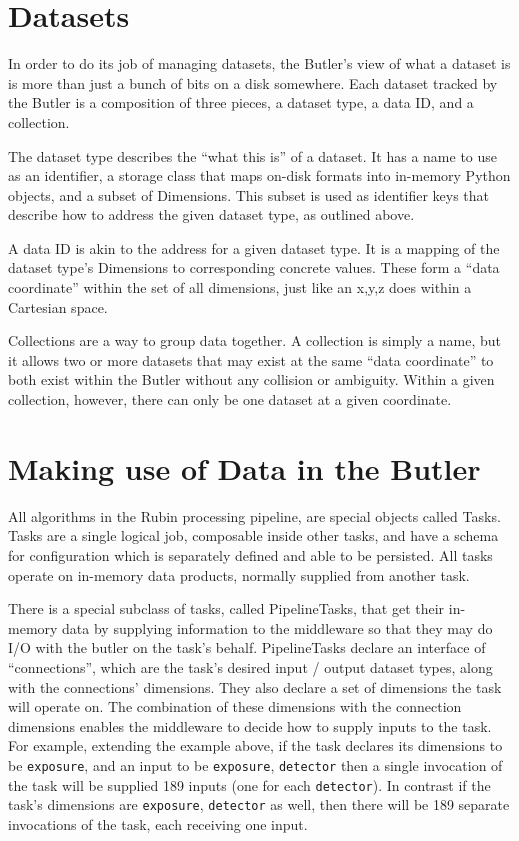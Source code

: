 \documentclass[11pt,twoside]{article}
\begin{document}
\section{Datasets}
In order to do its job of managing datasets, the Butler's view of what a dataset is is more than just a bunch of bits on a disk somewhere. Each dataset tracked by the Butler is a composition of three pieces, a dataset type, a data ID, and a collection.

The dataset type describes the ``what this is'' of a dataset. It has a name to use as an identifier, a storage class that maps on-disk formats into in-memory Python objects, and a subset of Dimensions. This subset is used as identifier keys that describe how to address the given dataset type, as outlined above.

A data ID is akin to the address for a given dataset type. It is a mapping of the dataset type's Dimensions to corresponding concrete values. These form a ``data coordinate'' within the set of all dimensions, just like an x,y,z does within a Cartesian space.

Collections are a way to group data together. A collection is simply a name, but it allows two or more datasets that may exist at the same ``data coordinate'' to both exist within the Butler without any collision or ambiguity. Within a given collection, however, there can only be one dataset at a given coordinate.

\section{Making use of Data in the Butler}
All algorithms in the Rubin processing pipeline, are special objects called Tasks. Tasks are a single logical job, composable inside other tasks, and have a schema for configuration which is separately defined and able to be persisted. All tasks operate on in-memory data products, normally supplied from another task.

There is a special subclass of tasks, called PipelineTasks, that get their in-memory data by supplying information to the middleware so that they may do I/O with the butler on the task's behalf. PipelineTasks declare an interface of ``connections'', which are the task's desired input / output dataset types, along with the connections' dimensions. They also declare a set of dimensions the task will operate on. The combination of these dimensions with the connection dimensions enables the middleware to decide how to supply inputs to the task. For example, extending the example above, if the task declares its dimensions to be \texttt{exposure}, and an input to be \texttt{exposure}, \texttt{detector} then a single invocation of the task will be supplied 189 inputs (one for each \texttt{detector}). In contrast if the task's dimensions are \texttt{exposure}, \texttt{detector} as well, then there will be 189 separate invocations of the task, each receiving one input.
\end{document}
